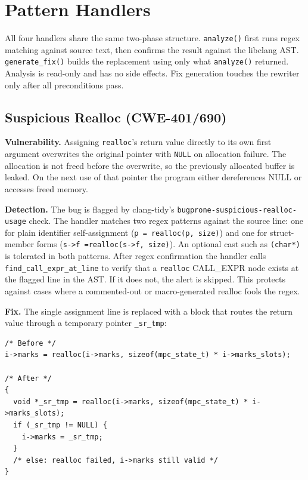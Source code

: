 \section{Pattern Handlers}
\label{sec:handlers}

All four handlers share the same two-phase structure. \texttt{analyze()} first runs regex matching against source text, then confirms the result against the libclang AST. \texttt{generate\_fix()} builds the replacement using only what \texttt{analyze()} returned. Analysis is read-only and has no side effects. Fix generation touches the rewriter only after all preconditions pass.

\subsection{Suspicious Realloc (CWE-401/690)}

\textbf{Vulnerability.} Assigning \texttt{realloc}'s return value directly to its own first argument overwrites the original pointer with \texttt{NULL} on allocation failure. The allocation is not freed before the overwrite, so the previously allocated buffer is leaked. On the next use of that pointer the program either dereferences NULL or accesses freed memory.

\textbf{Detection.} The bug is flagged by clang-tidy's \texttt{bugprone-suspicious-realloc-usage} check. The handler matches two regex patterns against the source line: one for plain identifier self-assignment (\texttt{p = realloc(p, size)}) and one for struct-member forms (\texttt{s->f =}\allowbreak\texttt{realloc(}\allowbreak\texttt{s->f, size)}). An optional cast such as \texttt{(char*)} is tolerated in both patterns. After regex confirmation the handler calls \texttt{find\_call\_expr\_at\_line} to verify that a \texttt{realloc} CALL\_EXPR node exists at the flagged line in the AST. If it does not, the alert is skipped. This protects against cases where a commented-out or macro-generated realloc fools the regex.

\textbf{Fix.} The single assignment line is replaced with a block that routes the return value through a temporary pointer \texttt{\_sr\_tmp}:

\begin{lstlisting}[caption={CWE-401/690 fix: suspicious realloc handler output}]
/* Before */
i->marks = realloc(i->marks, sizeof(mpc_state_t) * i->marks_slots);

/* After */
{
  void *_sr_tmp = realloc(i->marks, sizeof(mpc_state_t) * i->marks_slots);
  if (_sr_tmp != NULL) {
    i->marks = _sr_tmp;
  }
  /* else: realloc failed, i->marks still valid */
}
\end{lstlisting}

